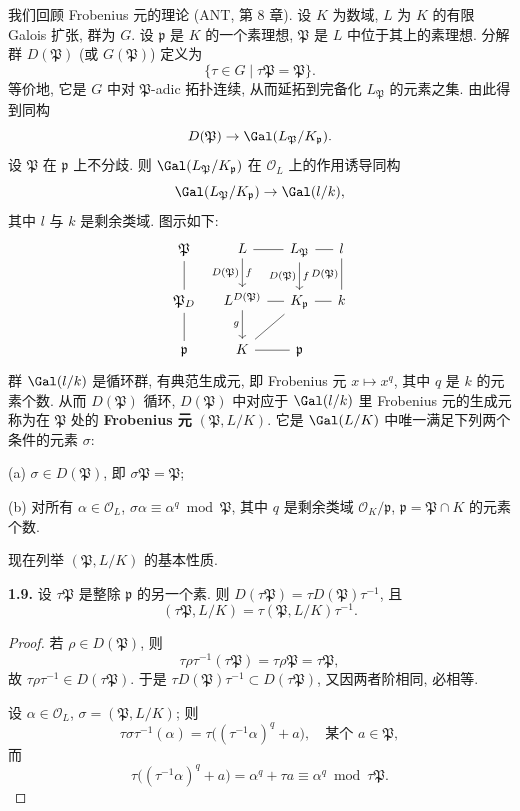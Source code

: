 我们回顾 Frobenius 元的理论 (ANT, 第 8 章). 设 $K$ 为数域, $L$ 为 $K$ 的有限 Galois 扩张, 群为 $G$. 设 $\mathfrak{p}$ 是 $K$ 的一个素理想, $\mathfrak{P}$ 是 $L$ 中位于其上的素理想. 分解群 $D(\mathfrak{P})$ (或 $G(\mathfrak{P})$) 定义为
\[
\{\tau\in G\mid\tau\mathfrak{P}=\mathfrak{P}\}.
\]
等价地, 它是 $G$ 中对 $\mathfrak{P}$-adic 拓扑连续, 从而延拓到完备化 $L_{\mathfrak{P}}$ 的元素之集. 由此得到同构
\[
D(\mathfrak{P})\to\Gal(L_{\mathfrak{P}}/K_{\mathfrak{p}}).
\]
设 $\mathfrak{P}$ 在 $\mathfrak{p}$ 上不分歧. 则 $\Gal(L_{\mathfrak{P}}/K_{\mathfrak{p}})$ 在 $\mathcal{O}_L$ 上的作用诱导同构
\[
\Gal(L_{\mathfrak{P}}/K_{\mathfrak{p}})\to\Gal(l/k),
\]
其中 $l$ 与 $k$ 是剩余类域. 图示如下:
\[
\begin{tikzcd}[column sep=small, row sep=small]
\mathfrak{P} \ar[dd, no head] & L \ar[r, no head] \ar[dd, "f", "D(\mathfrak{P})"'] & L_{\mathfrak{P}} \ar[r, no head] \ar[dd, "f", "D(\mathfrak{P})"'] & l \ar[dd, no head, "D(\mathfrak{P})"'] \\
& & & \\
\mathfrak{P}_D \ar[dd, no head] & L^{D(\mathfrak{P})} \ar[r, no head] \ar[dd, "g"'] & K_{\mathfrak{p}} \ar[r, no head] \ar[ddl, no head] & k \\
& & & \\
\mathfrak{p} & K \ar[r, no head] & \mathfrak{p} &
\end{tikzcd}
\]
群 $\Gal(l/k)$ 是循环群, 有典范生成元, 即 Frobenius 元 $x\mapsto x^q$, 其中 $q$ 是 $k$ 的元素个数. 从而 $D(\mathfrak{P})$ 循环, $D(\mathfrak{P})$ 中对应于 $\Gal(l/k)$ 里 Frobenius 元的生成元称为在 $\mathfrak{P}$ 处的 \textbf{Frobenius 元} $(\mathfrak{P},L/K)$. 它是 $\Gal(L/K)$ 中唯一满足下列两个条件的元素 $\sigma$:

(a) $\sigma\in D(\mathfrak{P})$, 即 $\sigma\mathfrak{P}=\mathfrak{P}$;

(b) 对所有 $\alpha\in\mathcal{O}_L$, $\sigma\alpha\equiv\alpha^q\bmod\mathfrak{P}$, 其中 $q$ 是剩余类域 $\mathcal{O}_K/\mathfrak{p}$, $\mathfrak{p}=\mathfrak{P}\cap K$ 的元素个数.

现在列举 $(\mathfrak{P},L/K)$ 的基本性质.

\textbf{1.9.} 设 $\tau\mathfrak{P}$ 是整除 $\mathfrak{p}$ 的另一个素. 则 $D(\tau\mathfrak{P})=\tau D(\mathfrak{P})\tau^{-1}$, 且
\[
(\tau\mathfrak{P},L/K)=\tau(\mathfrak{P},L/K)\tau^{-1}.
\]

\begin{proof}
若 $\rho\in D(\mathfrak{P})$, 则
\[
\tau\rho\tau^{-1}(\tau\mathfrak{P})=\tau\rho\mathfrak{P}=\tau\mathfrak{P},
\]
故 $\tau\rho\tau^{-1}\in D(\tau\mathfrak{P})$. 于是 $\tau D(\mathfrak{P})\tau^{-1}\subset D(\tau\mathfrak{P})$, 又因两者阶相同, 必相等.

设 $\alpha\in\mathcal{O}_L$, $\sigma=(\mathfrak{P},L/K)$; 则
\[
\tau\sigma\tau^{-1}(\alpha)=\tau\bigl((\tau^{-1}\alpha)^q+a\bigr),\quad\text{某个 }a\in\mathfrak{P},
\]
而
\[
\tau\bigl((\tau^{-1}\alpha)^q+a\bigr)=\alpha^q+\tau a\equiv\alpha^q\bmod\tau\mathfrak{P}.
\]
\end{proof}

